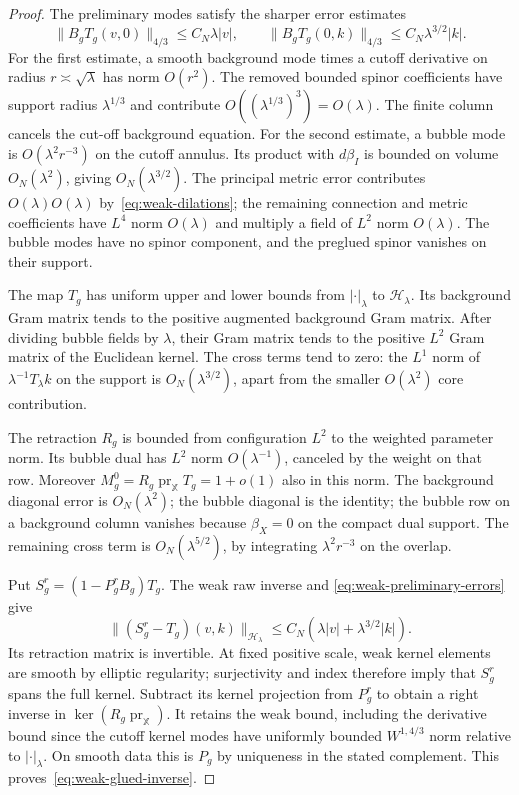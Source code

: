 \documentclass[11pt]{amsart}
\theoremstyle{definition}
\theoremstyle{remark}
\theoremstyle{plain}
\begin{document}
\begin{proof}
The preliminary modes satisfy the sharper error estimates
\begin{equation}\label{eq:weak-preliminary-errors}
 \|B_gT_g(v,0)\|_{4/3}\leq C_N\lambda|v|,
 \qquad
 \|B_gT_g(0,k)\|_{4/3}\leq C_N\lambda^{3/2}|k|.
\end{equation}
For the first estimate, a smooth background mode times a cutoff
derivative on radius $r\asymp\sqrt\lambda$ has norm $O(r^2)$.
The removed bounded spinor coefficients have support radius
$\lambda^{1/3}$ and contribute $O((\lambda^{1/3})^3)=O(\lambda)$.
The finite column cancels the cut-off background equation.
For the second estimate, a bubble mode is
$O(\lambda^2r^{-3})$ on the cutoff annulus.  Its product with
$d\beta_I$ is bounded on volume $O_N(\lambda^2)$, giving
$O_N(\lambda^{3/2})$.  The principal metric error contributes
$O(\lambda)O(\lambda)$ by~\eqref{eq:weak-dilations}; the remaining
connection and metric coefficients have $L^4$ norm $O(\lambda)$
and multiply a field of $L^2$ norm $O(\lambda)$.
The bubble modes have no spinor component, and the preglued spinor
vanishes on their support.

The map $T_g$ has uniform upper and lower bounds from
$|\cdot|_\lambda$ to $\mathcal H_\lambda$.  Its background Gram
matrix tends to the positive augmented background Gram matrix.
After dividing bubble fields by $\lambda$, their Gram matrix tends
to the positive $L^2$ Gram matrix of the Euclidean kernel.  The
cross terms tend to zero: the $L^1$ norm of
$\lambda^{-1}T_\lambda k$ on the support is $O_N(\lambda^{3/2})$,
apart from the smaller $O(\lambda^2)$ core contribution.

The retraction $R_g$ is bounded from configuration $L^2$ to the
weighted parameter norm.  Its bubble dual has $L^2$ norm
$O(\lambda^{-1})$, canceled by the weight on that row.
Moreover $M_g^0=R_g\operatorname{pr}_{\mathbb X}T_g=1+o(1)$
also in this norm.  The background diagonal error is $O_N(\lambda^2)$;
the bubble diagonal is the identity; the bubble row on a background
column vanishes because $\beta_X=0$ on the compact dual support.
The remaining cross term is $O_N(\lambda^{5/2})$, by integrating
$\lambda^2r^{-3}$ on the overlap.

Put $S_g^r=(1-P_g^rB_g)T_g$.  The weak raw inverse and
\eqref{eq:weak-preliminary-errors} give
\begin{equation}\label{eq:weak-kernel-lift-error}
 \|(S_g^r-T_g)(v,k)\|_{\mathcal H_\lambda}
 \leq C_N(\lambda|v|+\lambda^{3/2}|k|).
\end{equation}
Its retraction matrix is invertible.  At fixed positive scale, weak
kernel elements are smooth by elliptic regularity; surjectivity and
index therefore imply that $S_g^r$ spans the full kernel.
Subtract its kernel projection from $P_g^r$ to obtain a right inverse
in $\ker(R_g\operatorname{pr}_{\mathbb X})$.  It retains the weak
bound, including the derivative bound since the cutoff kernel modes
have uniformly bounded $W^{1,4/3}$ norm relative to
$|\cdot|_\lambda$.  On smooth data this is $P_g$ by uniqueness
in the stated complement.  This proves~\eqref{eq:weak-glued-inverse}.


\end{proof}
\end{document}
